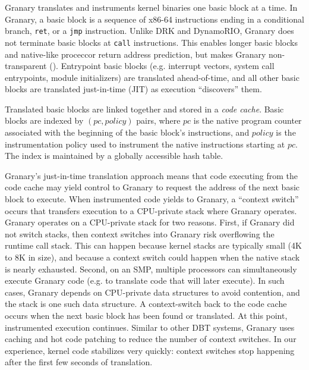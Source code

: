 \documentclass[preprint]{sigplanconf}
\begin{document}
Granary translates and instruments kernel binaries one basic block at a time. In Granary, a basic block is a sequence of x86-64 instructions ending in a conditional branch, \texttt{ret}, or a \texttt{jmp} instruction. Unlike DRK and DynamoRIO, Granary does not terminate basic blocks at \texttt{call} instructions. This enables longer basic blocks and native-like proceccor return address prediction, but makes Granary non-transparent (). Entrypoint basic blocks (e.g. interrupt vectors, system call entrypoints, module initializers) are translated ahead-of-time, and all other basic blocks are translated just-in-time (JIT) as execution ``discovers'' them.

Translated basic blocks are linked together and stored in a \emph{code cache}. Basic blocks are indexed by $(pc, policy)$ pairs, where $pc$ is the native program counter associated with the beginning of the basic block's instructions, and $policy$ is the instrumentation policy used to instrument the native instructions starting at $pc$. The index is maintained by a globally accessible hash table.

Granary's just-in-time translation approach means that code executing from the code cache may yield control to Granary to request the address of the next basic block to execute. When instrumented code yields to Granary, a ``context switch'' occurs that transfers execution to a CPU-private stack where Granary operates. Granary operates on a CPU-private stack for two reasons. First, if Granary did not switch stacks, then context switches into Granary risk overflowing the runtime call stack. This can happen because kernel stacks are typically small (4K to 8K in size), and because a context switch could happen when the native stack is nearly exhausted. Second, on an SMP, multiple processors can simultaneously execute Granary code (e.g. to translate code that will later execute). In such cases, Granary depends on CPU-private data structures to avoid contention, and the stack is one such data structure. A context-switch back to the code cache occurs when the next basic block has been found or translated. At this point, instrumented execution continues. Similar to other DBT systems, Granary uses caching and hot code patching to reduce the number of context switches. In our experience, kernel code stabilizes very quickly: context switches stop happening after the first few seconds of translation.

\end{document}
